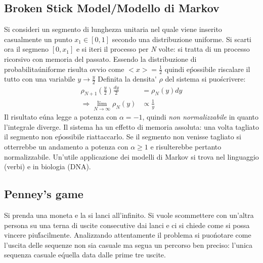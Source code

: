 \documentclass[12pt, a4paper]{book}
\theoremstyle{theorem}
\begin{document}
			\subsection{Broken Stick Model/Modello di Markov}
				Si consideri un segmento di lunghezza unitaria nel quale viene inserito casualmente un punto $x_1\in[0,1]$ secondo una distribuzione uniforme.
				Si scarti ora il segmeno $[0,x_1]$ e si iteri il processo per \textit{N} volte: si tratta di un processo ricorsivo con memoria del passato.
				Essendo la distribuzione di probabilita\' uniforme risulta ovvio come $<x>=\frac{1}{2}$ quindi e\' possibile riscalare il tutto con una variabile $y\rightarrow\frac{y}{2}$
				Definita la densita\' $\rho$ del sistema si puo\' scrivere:
				\begin{equation*}
					\begin{split}
						\rho_{N+1}\left(\frac{y}{2}\right)\frac{dy}{2}&=\rho_N(y)dy\\
						\Rightarrow\lim_{N\to\infty}\rho_N(y)&\propto\frac{1}{y}
					\end{split}
				\end{equation*}
				Il risultato e\' una legge a potenza con $\alpha=-1$, quindi \textit{non normalizzabile} in quanto l'integrale diverge.
				Il sistema ha un effetto di memoria assoluta: una volta tagliato il segmento non e\' possibile riattaccarlo.
				Se il segmento non venisse tagliato si otterrebbe un andamento a potenza con $\alpha\geq 1$ e risulterebbe pertanto normalizzabile.
				Un'utile applicazione dei modelli di Markov si trova nel linguaggio (verbi) e in biologia (DNA).
			\subsection{Penney's game}
				Si prenda una moneta e la si lanci all'infinito.
				Si vuole scommettere con un'altra persona su una terna di uscite consecutive dai lanci e ci si chiede come si possa vincere piu\' facilmente.
				Analizzando attentamente il problema si puo\' notare come l'uscita delle sequenze non sia casuale ma segua un percorso ben preciso: l'unica sequenza casuale e\' quella data dalle prime tre uscite.
							
\end{document}
